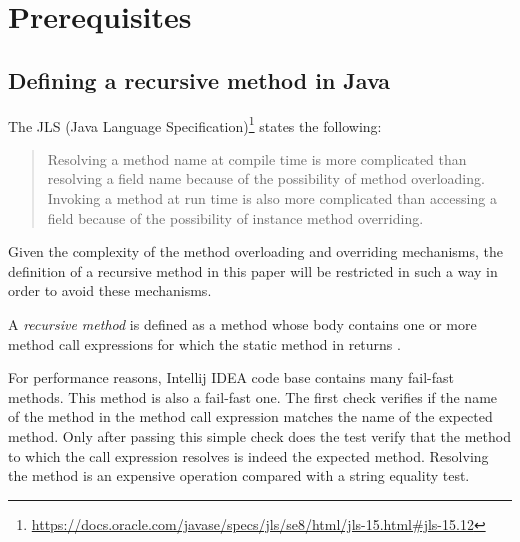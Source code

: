 \chapter{Prerequisites}

\section{Defining a recursive method in Java}

The JLS (Java Language Specification)\footnote{\url{https://docs.oracle.com/javase/specs/jls/se8/html/jls-15.html#jls-15.12}}
states the following:
\begin{quote}
    Resolving a method name at compile time is more complicated than resolving a field name because of the possibility
    of method overloading. Invoking a method at run time is also more complicated than accessing a field because of the
    possibility of instance method overriding.
\end{quote}
Given the complexity of the method overloading and overriding mechanisms, the definition of a recursive method in this
paper will be restricted in such a way in order to avoid these mechanisms.

A \textit{recursive method} is defined as a method whose body contains one or more method call expressions for which the
static method in  returns .


For performance reasons, Intellij IDEA code base contains many fail-fast methods. This method is also a fail-fast one.
The first check verifies if the name of the method in the method call expression matches the name of the expected
method. Only after passing this simple check does the test verify that the method to which the call expression resolves
is indeed the expected method. Resolving the method is an expensive operation compared with a string equality test.

